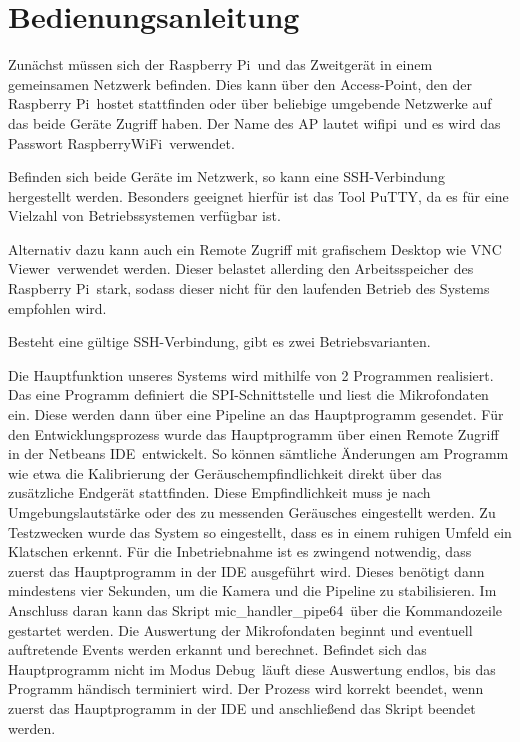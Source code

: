 \section{Bedienungsanleitung}

Zunächst müssen sich der \glqq Raspberry Pi\grqq\ und das Zweitgerät in einem gemeinsamen Netzwerk befinden. Dies kann über den Access-Point, den der \glqq Raspberry Pi\grqq\ hostet stattfinden oder über beliebige umgebende Netzwerke auf das beide Geräte Zugriff haben. Der Name des AP lautet \glqq wifipi\grqq\ und es wird das Passwort \glqq RaspberryWiFi\grqq\ verwendet.

Befinden sich beide Geräte im Netzwerk, so kann eine SSH-Verbindung hergestellt werden. Besonders geeignet hierfür ist das Tool \glqq PuTTY\grqq, da es für eine Vielzahl von Betriebssystemen verfügbar ist. 

Alternativ dazu kann auch ein Remote Zugriff mit grafischem Desktop wie \glqq VNC Viewer\grqq\ verwendet werden. Dieser belastet allerding den Arbeitsspeicher des \glqq Raspberry Pi\grqq\  stark, sodass dieser nicht für den laufenden Betrieb des Systems empfohlen wird. 

Besteht eine gültige SSH-Verbindung, gibt es zwei Betriebsvarianten. 

Die Hauptfunktion unseres Systems wird mithilfe von 2 Programmen realisiert. Das eine Programm definiert die SPI-Schnittstelle und liest die Mikrofondaten ein. Diese werden dann über eine Pipeline an das Hauptprogramm gesendet. Für den Entwicklungsprozess wurde das Hauptprogramm über einen Remote Zugriff in der \glqq Netbeans IDE\grqq\ entwickelt. So können sämtliche Änderungen am Programm wie etwa die Kalibrierung der Geräuschempfindlichkeit direkt über das zusätzliche Endgerät stattfinden. Diese Empfindlichkeit muss je nach Umgebungslautstärke oder des zu messenden Geräusches eingestellt werden. Zu Testzwecken wurde das System so eingestellt, dass es in einem ruhigen Umfeld ein Klatschen erkennt. Für die Inbetriebnahme ist es zwingend notwendig, dass zuerst das Hauptprogramm in der IDE ausgeführt wird. Dieses benötigt dann mindestens vier Sekunden, um die Kamera und die Pipeline zu stabilisieren. Im Anschluss daran kann das Skript \glqq mic\_handler\_pipe64\grqq\ über die Kommandozeile gestartet werden. Die Auswertung der Mikrofondaten beginnt und eventuell auftretende Events werden erkannt und berechnet. Befindet sich das Hauptprogramm nicht im Modus \glqq Debug\grqq\ läuft diese Auswertung endlos, bis das Programm händisch terminiert wird. Der Prozess wird korrekt beendet, wenn zuerst das Hauptprogramm in der IDE und anschließend das Skript beendet werden.

